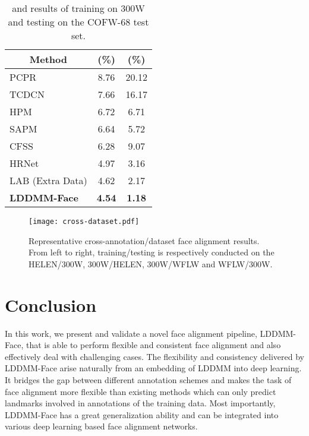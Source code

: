 \documentclass[10pt,twocolumn,letterpaper]{article}
\begin{document}
\begin{table}[h!]
\renewcommand\arraystretch{1.1}
    \center
    \small
\begin{tabular}{@{}ccc@{}}
    \toprule
    \multicolumn{1}{c}{Method} & \multicolumn{1}{c}{(\%)} & \multicolumn{1}{c}{(\%)} \\ 
    \hline
    \multicolumn{1}{l}{PCPR \cite{burgos2013robust}} & 8.76 & \multicolumn{1}{c}{20.12} \\
    \multicolumn{1}{l}{TCDCN \cite{zhang2016learning}} & 7.66 & \multicolumn{1}{c}{16.17} \\
    \multicolumn{1}{l}{HPM \cite{ghiasi2014occlusion}} & 6.72 & \multicolumn{1}{c}{6.71} \\ 
    \multicolumn{1}{l}{SAPM \cite{ghiasi2015using}} & 6.64 & \multicolumn{1}{c}{5.72} \\
    \multicolumn{1}{l}{CFSS \cite{zhu2015face}} & 6.28 & \multicolumn{1}{c}{9.07} \\
    \multicolumn{1}{l}{HRNet \cite{wang2020deep}} & 4.97 & \multicolumn{1}{c}{3.16} \\
    \multicolumn{1}{l}{LAB (Extra Data) \cite{Wu_2018_CVPR}} & 4.62 & \multicolumn{1}{c}{2.17} \\
    \hline
    \multicolumn{1}{l}{\textbf{LDDMM-Face}} & \textbf{4.54} & \multicolumn{1}{c}{\textbf{1.18}} \\
    \bottomrule
    \end{tabular}\caption{ and  results of training on 300W and testing on the COFW-68 test set.}
    \label{Tab:COFW}
\vspace{-1mm}
\end{table}
 





   


\begin{figure}[thbp]
\begin{center}
  \texttt{[image: cross-dataset.pdf]}
\end{center}
  \caption{Representative cross-annotation/dataset face alignment results. From left to right, training/testing is respectively conducted on the HELEN/300W, 300W/HELEN, 300W/WFLW and WFLW/300W.}
\label{fig:cro}
\vspace{-4mm}
\end{figure}

\section{Conclusion}
In this work, we present and validate a novel face alignment pipeline, LDDMM-Face, that is able to perform flexible and consistent face alignment and also effectively deal with challenging cases. The flexibility and consistency delivered by LDDMM-Face arise naturally from an embedding of LDDMM into deep learning. It bridges the gap between different annotation schemes and makes the task of face alignment more flexible than existing methods which can only predict landmarks involved in annotations of the training data.
Most importantly, LDDMM-Face has a great generalization ability and can be integrated into various deep learning based face alignment networks.

{\small


}
\end{document}
